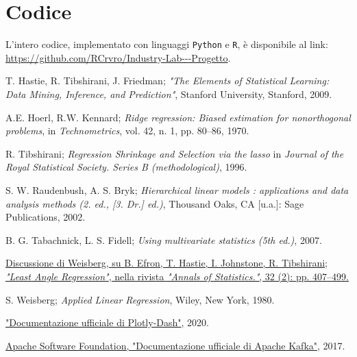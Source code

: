 \documentclass[fleqn,10pt]{SelfArx} %
\begin{document}
\section*{Codice}
L'intero codice, implementato con linguaggi \texttt{Python} e \texttt{R}, è disponibile al link: \url{https://github.com/RCrvro/Industry-Lab---Progetto}.
\newpage
{}

\begin{thebibliography}{9}

T. Hastie, R. Tibshirani, J. Friedman; \textit{"The Elements of Statistical Learning: Data Mining, Inference, and Prediction"}, Stanford University, Stanford, 2009. 

A.E. Hoerl, R.W. Kennard; \textit{Ridge regression: Biased estimation for nonorthogonal problems}, in \textit{Technometrics}, vol. 42, n. 1, pp. 80–86, 1970.

R. Tibshirani; \textit{Regression Shrinkage and Selection via the lasso} in \textit{Journal of the Royal Statistical Society. Series B (methodological)}, 1996.

S. W. Raudenbush, A. S. Bryk; \textit{Hierarchical linear models : applications and data analysis methods (2. ed., [3. Dr.] ed.)}, Thousand Oaks, CA [u.a.]: Sage Publications, 2002.

B. G. Tabachnick, L. S. Fidell; \textit{Using multivariate statistics (5th ed.)}, 2007.
 
\href{https://arxiv.org/pdf/math/0406473.pdf}{Discussione di Weisberg, su B. Efron, T. Hastie, I. Johnstone, R. Tibshirani; \textit{"Least Angle Regression"}, nella rivista \textit{"Annals of Statistics."}, 32 (2): pp. 407–499.} 

S. Weisberg; \textit{Applied Linear Regression}, Wiley, New York, 1980.

\href{https://plotly.com}{"Documentazione ufficiale di Plotly-Dash"}, 2020.

\href{https://kafka.apache.org}{Apache Software Foundation, "Documentazione ufficiale di Apache Kafka"}, 2017.

\end{thebibliography}
\end{document}
